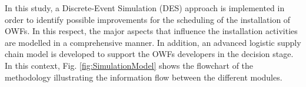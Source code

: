 In this study, a Discrete-Event Simulation (DES) approach is implemented in order to identify possible improvements for the scheduling of the installation of OWFs. In this respect, the major aspects that influence the installation activities are modelled in a comprehensive manner. In addition, an advanced logistic supply chain model is developed to support the OWFs developers in the decision stage. In this context, Fig. \ref{fig:SimulationModel} shows the flowchart of the methodology illustrating the information flow between the different modules.